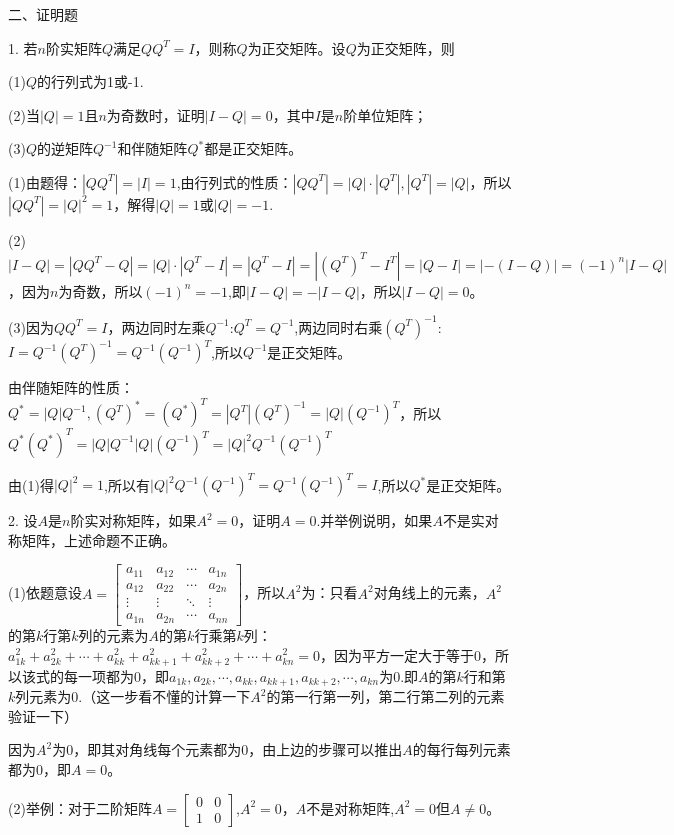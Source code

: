\documentclass{article}
\begin{document}
二、证明题

1. 若$n$阶实矩阵$Q$满足$QQ^{T}=I$，则称$Q$为正交矩阵。设$Q$为正交矩阵，则

(1)$Q$的行列式为1或-1.

(2)当$|Q|=1$且$n$为奇数时，证明$|I-Q|=0$，其中$I$是$n$阶单位矩阵；

(3)$Q$的逆矩阵$Q^{-1}$和伴随矩阵$Q^{*}$都是正交矩阵。

\begin{zhengming}
(1)由题得：$|QQ^{T}|=|I|=1$,由行列式的性质：$|QQ^{T}|=|Q|\cdot|Q^T|,|Q^T|=|Q|$，所以$|QQ^{T}|=|Q|^2=1$，解得$|Q|=1$或$|Q|=-1$.

(2)$|I-Q|=|QQ^{T}-Q|=|Q|\cdot|Q^T-I|=|Q^T-I|=|(Q^T)^T-I^T|=|Q-I|=|-(I-Q)|=(-1)^{n}|I-Q|$，因为$n$为奇数，所以$(-1)^n=-1$,即$|I-Q|=-|I-Q|$，所以$|I-
Q|=0$。

(3)因为$QQ^{T}=I$，两边同时左乘$Q^{-1}$:$Q^{T}=Q^{-1}$,两边同时右乘$(Q^{T})^{-1}$:$I=Q^{-1}(Q^{T})^{-1}=Q^{-1}(Q^{-1})^{T}$,所以$Q^{-1}$是正交矩阵。

由伴随矩阵的性质：$Q^*=|Q|Q^{-1},(Q^T)^*=(Q^*)^T=|Q^T|(Q^{T})^{-1}=|Q|(Q^{-1})^{T}$，所以$Q^*(Q^*)^T=|Q|Q^{-1}|Q|(Q^{-1})^{T}=|Q|^{2}Q^{-1}(Q^{-1})^{T}$

由(1)得$|Q|^{2}=1$,所以有$|Q|^{2}Q^{-1}(Q^{-1})^{T}=Q^{-1}(Q^{-1})^{T}=I$,所以$Q^{*}$是正交矩阵。
\end{zhengming}

2. 设$A$是$n$阶实对称矩阵，如果$A^{2}=0$，证明$A=0$.并举例说明，如果$A$不是实对称矩阵，上述命题不正确。

\begin{zhengming}

(1)依题意设$A=
\begin{bmatrix}
  a_{11} & a_{12} & \cdots & a_{1n} \\
  a_{12} & a_{22} & \cdots & a_{2n} \\
  \vdots & \vdots & \ddots & \vdots \\
  a_{1n} & a_{2n} & \cdots & a_{nn}
\end{bmatrix}
$，所以$A^2$为：只看$A^2$对角线上的元素，$A^2$的第$k$行第$k$列的元素为$A$的第$k$行乘第$k$列：$a_{1k}^2+a_{2k}^2+\cdots+a_{kk}^2+a_{kk+1}^2+a_{kk+2}^2+\cdots+a_{kn}^2=0$，因为平方一定大于等于0，所以该式的每一项都为0，即$a_{1k},a_{2k},\cdots,a_{kk},a_{kk+1},a_{kk+2},\cdots,a_{kn}$为0.即$A$的第$k$行和第$k$列元素为0.\textcolor[rgb]{1.00,0.00,0.00}{（这一步看不懂的计算一下$A^2$的第一行第一列，第二行第二列的元素验证一下）}

因为$A^2$为0，即其对角线每个元素都为0，由上边的步骤可以推出$A$的每行每列元素都为0，即$A=0$。

(2)举例：对于二阶矩阵$
A=\begin{bmatrix}
0& 0\\
1& 0
\end{bmatrix}
$,$A^2=0$，$A$不是对称矩阵,$A^2=0$但$A\neq0$。
\end{zhengming}
\end{document}
